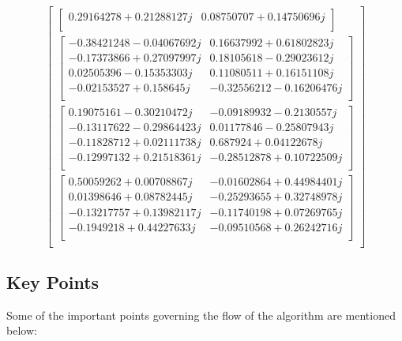 \documentclass[conference]{IEEEtran}
\begin{document}
$$\begin{bmatrix}
\begin{bmatrix}
0.29164278+0.21288127j  &0.08750707+0.14750696j\\
\end{bmatrix}\\
\begin{bmatrix}
-0.38421248-0.04067692j& 0.16637992+0.61802823j\\ 
-0.17373866+0.27097997j& 0.18105618-0.29023612j \\
0.02505396-0.15353303j& 0.11080511+0.16151108j\\
-0.02153527+0.158645j& -0.32556212-0.16206476j\\
\end{bmatrix}\\
\begin{bmatrix}
0.19075161-0.30210472j& -0.09189932-0.2130557j\\  
-0.13117622-0.29864423j&  0.01177846-0.25807943j\\
-0.11828712+0.02111738j&  0.687924  +0.04122678j\\
-0.12997132+0.21518361j& -0.28512878+0.10722509j\\
\end{bmatrix}\\
\begin{bmatrix}
0.50059262+0.00708867j& -0.01602864+0.44984401j\\  
0.01398646+0.08782445j& -0.25293655+0.32748978j\\
-0.13217757+0.13982117j& -0.11740198+0.07269765j\\
-0.1949218 +0.44227633j& -0.09510568+0.26242716j\\
\end{bmatrix}\\


\end{bmatrix}
$$
\subsection{Key Points}
Some of the important points governing the flow of the algorithm are mentioned below:
\end{document}
